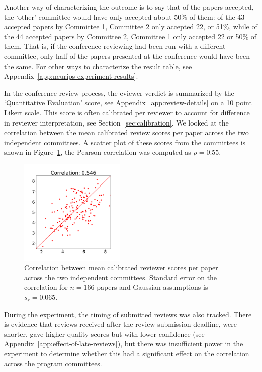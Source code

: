 \documentclass[twoside]{article}
\begin{document}
Another way of characterizing the outcome is to say that of the papers
accepted, the `other' committee would have only accepted about 50\% of them:
of the 43 accepted papers by Committee 1, Committee 2 only accepted
22, or 51\%, while of the 44 accepted papers by Committee 2, Committee
1 only accepted 22 or 50\% of them. That is, if the conference
reviewing had been run with a different committee, only half of the
papers presented at the conference would have been the same. For other
ways to characterize the result table, see Appendix~\ref{app:neurips-experiment-results}.

In the conference review process, the eviewer verdict is summarized by the `Quantitative Evaluation'
score, see Appendix~\ref{app:review-details} on a 10 point Likert
scale.  This score is often calibrated per reviewer to account for
difference in reviewer interpretation, see
Section~\ref{sec:calibration}. We looked at the correlation between
the mean calibrated review
scores per paper across the two independent committees. A scatter plot of these
scores from the committees is shown in Figure~\ref{figure-calibrated-quality-correlation}, the Pearson correlation
was computed as $\rho=0.55$. 
\begin{figure}[htb]
\centering
\includegraphics[width=0.45\textwidth]{diagrams/neurips/calibrated-quality-correlation.pdf}

\caption{Correlation between mean calibrated reviewer scores per paper
  across the two
  independent committees. Standard error on the correlation for
  $n=166$ papers and Gaussian assumptions is $s_r = 0.065$.}
\label{figure-calibrated-quality-correlation}
\end{figure}

During the experiment, the timing of submitted reviews was also
tracked. There is evidence that reviews received after the review submission
deadline, were shorter, gave higher quality scores but with lower
confidence (see Appendix~\ref{app:effect-of-late-reviews}), but there
was insufficient power in the experiment to determine whether this had
a significant effect on the correlation across the program committees.
\end{document}
